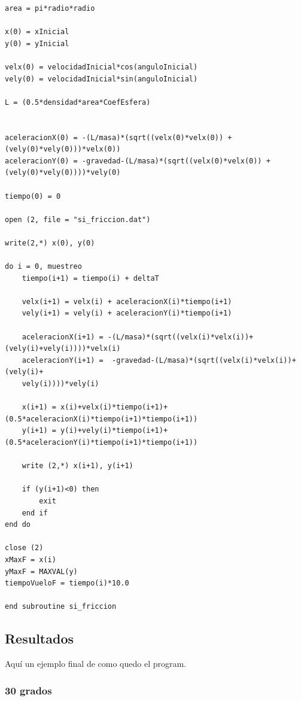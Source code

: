 \documentclass[10pt]{article}
\begin{document}
\begin{verbatim}
area = pi*radio*radio

x(0) = xInicial
y(0) = yInicial

velx(0) = velocidadInicial*cos(anguloInicial)
vely(0) = velocidadInicial*sin(anguloInicial)

L = (0.5*densidad*area*CoefEsfera)


aceleracionX(0) = -(L/masa)*(sqrt((velx(0)*velx(0)) + (vely(0)*vely(0)))*velx(0))
aceleracionY(0) = -gravedad-(L/masa)*(sqrt((velx(0)*velx(0)) + (vely(0)*vely(0))))*vely(0)

tiempo(0) = 0

open (2, file = "si_friccion.dat")

write(2,*) x(0), y(0)

do i = 0, muestreo
    tiempo(i+1) = tiempo(i) + deltaT

    velx(i+1) = velx(i) + aceleracionX(i)*tiempo(i+1)
    vely(i+1) = vely(i) + aceleracionY(i)*tiempo(i+1)

    aceleracionX(i+1) = -(L/masa)*(sqrt((velx(i)*velx(i))+(vely(i)+vely(i))))*velx(i)
    aceleracionY(i+1) =  -gravedad-(L/masa)*(sqrt((velx(i)*velx(i))+(vely(i)+
    vely(i))))*vely(i)

    x(i+1) = x(i)+velx(i)*tiempo(i+1)+(0.5*aceleracionX(i)*tiempo(i+1)*tiempo(i+1))
    y(i+1) = y(i)+vely(i)*tiempo(i+1)+(0.5*aceleracionY(i)*tiempo(i+1)*tiempo(i+1))

    write (2,*) x(i+1), y(i+1)

    if (y(i+1)<0) then
        exit
    end if
end do

close (2)
xMaxF = x(i)
yMaxF = MAXVAL(y)
tiempoVueloF = tiempo(i)*10.0

end subroutine si_friccion
\end{verbatim}

\newpage

\subsection{Resultados}
Aquí un ejemplo final de como quedo el program.

\subsubsection{30 grados}
\end{document}
